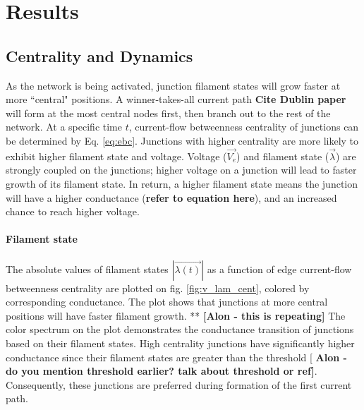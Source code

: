 \documentclass[%
 reprint,
 amsmath,amssymb,
 aps,
floatfix,
]{revtex4-2}
\begin{document}
\clearpage

\section{\label{sec:level1} Results}
\subsection{\label{sec:level2} Centrality and Dynamics}

As the network is being activated, junction filament states will grow faster at more ``central" positions. A winner-takes-all current path \textbf{Cite Dublin paper} will form at the most central nodes first, then branch out to the rest of the network. At a specific time $t$, current-flow betweenness centrality of junctions can be determined by Eq. \ref{eq:ebc}. Junctions with higher centrality are more likely to exhibit higher filament state and voltage. Voltage ($\vec{V_e}$) and filament state ($\vec{\lambda}$) are strongly coupled on the junctions; higher voltage on a junction will lead to faster growth of its filament state. In return, a higher filament state means the junction will have a higher conductance (\textbf{refer to equation here}), and an increased chance to reach higher voltage.


\paragraph{Filament state}

The absolute values of filament states $|\vec{\lambda (t)}|$ as a function of edge current-flow betweenness centrality are plotted on fig. \ref{fig:v_lam_cent}, colored by corresponding conductance. The plot shows that junctions at more central positions will have faster filament growth. **  \textbf{[Alon - this is repeating]} The color spectrum on the plot demonstrates the conductance transition of junctions based on their filament states. High centrality junctions have significantly higher conductance since their filament states are greater than the threshold [ \textbf{Alon - do you mention threshold earlier? talk about threshold or ref]}. Consequently, these junctions are preferred during formation of the first current path.
\end{document}
